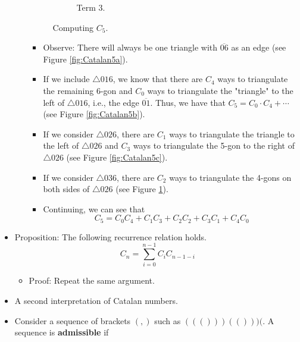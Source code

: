 \documentclass[../apprentice.tex]{subfiles}
\begin{document}
\begin{itemize}
\begin{itemize}
\begin{figure}[h!]
\begin{subfigure}[b]{0.24\linewidth}
                \caption{Term 3.}
                \label{fig:Catalan5d}
            \end{subfigure}
            \caption{Computing $C_5$.}
            \label{fig:Catalan5}
        \end{figure}
        \begin{itemize}
            \item Observe: There will always be one triangle with $\overline{06}$ as an edge (see Figure \ref{fig:Catalan5a}).
            \item If we include $\triangle 016$, we know that there are $C_4$ ways to triangulate the remaining 6-gon and $C_0$ ways to triangulate the "triangle" to the left of $\triangle 016$, i.e., the edge $\overline{01}$. Thus, we have that $C_5=C_0\cdot C_4+\cdots$ (see Figure \ref{fig:Catalan5b}).
            \item If we consider $\triangle 026$, there are $C_1$ ways to triangulate the triangle to the left of $\triangle 026$ and $C_3$ ways to triangulate the 5-gon to the right of $\triangle 026$ (see Figure \ref{fig:Catalan5c}).
            \item If we consider $\triangle 036$, there are $C_2$ ways to triangulate the 4-gons on both sides of $\triangle 026$ (see Figure \ref{fig:Catalan5d}).
            \item Continuing, we can see that
            \begin{equation*}
                C_5 = C_0C_4+C_1C_3+C_2C_2+C_3C_1+C_4C_0
            \end{equation*}
        \end{itemize}
    \end{itemize}
    \item Proposition: The following recurrence relation holds.
    \begin{equation*}
        C_n = \sum_{i=0}^{n-1}C_iC_{n-1-i}
    \end{equation*}
    \begin{itemize}
        \item Proof: Repeat the same argument.
    \end{itemize}
    \item A second interpretation of Catalan numbers.
    \item Consider a sequence of brackets $(,)$ such as $((()))(()))($. A sequence is \textbf{admissible} if
    \begin{enumerate}

\end{enumerate}
\end{itemize}
\end{document}
